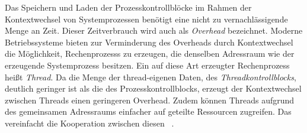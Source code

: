 Das Speichern und Laden der Prozesskontrollblöcke im Rahmen der Kontextwechsel von Systemprozessen benötigt eine nicht zu vernachlässigende Menge an Zeit. Dieser Zeitverbrauch wird auch als \emph{Overhead} bezeichnet. Moderne Betriebssysteme bieten zur Verminderung des Overheads durch Kontextwechsel die Möglichkeit, \glspl{Rechenprozess} zu erzeugen, die denselben Adressraum wie der erzeugende Systemprozess besitzen. Ein auf diese Art erzeugter \gls{Rechenprozess} heißt \emph{Thread}. Da die Menge der thread-eigenen Daten, des \emph{Threadkontrollblocks}, deutlich geringer ist als die des Prozesskontrollblocks, erzeugt der Kontextwechsel zwischen Threads einen geringeren Overhead. Zudem können Threads aufgrund des gemeinsamen Adressraums einfacher auf geteilte Ressourcen zugreifen. Das vereinfacht die Kooperation zwischen diesen ~\cite[S.~139~\psqq]{Tanenbaum2016}.

